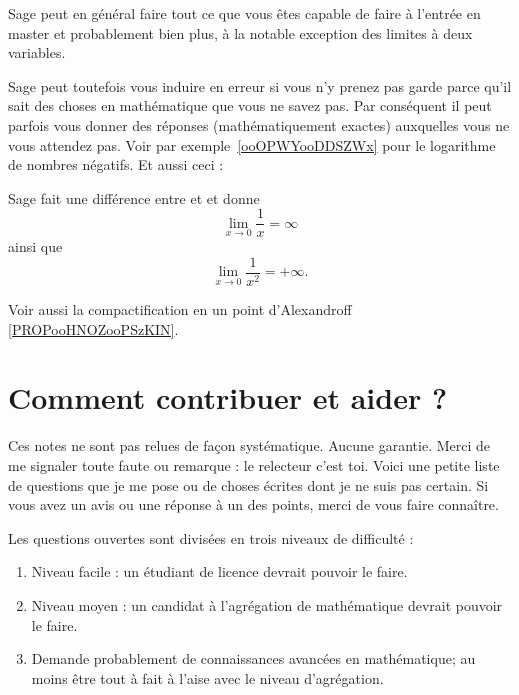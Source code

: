 Sage peut en général faire tout ce que vous êtes capable de faire à l'entrée en master et probablement bien plus, à la notable exception des limites à deux variables.

\begin{remark}
    Sage peut toutefois vous induire en erreur si vous n'y prenez pas garde parce qu'il sait des choses en mathématique que vous ne savez pas. Par conséquent il peut parfois vous donner des réponses (mathématiquement exactes) auxquelles vous ne vous attendez pas. Voir par exemple~\ref{ooOPWYooDDSZWx} pour le logarithme de nombres négatifs. Et aussi ceci :



Sage fait une différence entre  et  et donne
\begin{equation}
    \lim_{x\to 0} \frac{1}{ x }=\infty
\end{equation}
ainsi que
\begin{equation}
    \lim_{x\to 0} \frac{1}{ x^2 }=+\infty.
\end{equation}
\end{remark}

Voir aussi la compactification en un point d'Alexandroff \ref{PROPooHNOZooPSzKIN}.

\section{Comment contribuer et aider ?}
\label{SecooCKWWooBFgnea}

Ces notes ne sont pas relues de façon systématique. Aucune garantie. Merci de me signaler toute faute ou remarque : le relecteur c'est toi. Voici une petite liste de questions que je me pose ou de choses écrites dont je ne suis pas certain. Si vous avez un avis ou une réponse à un des points, merci de vous faire connaître.

Les questions ouvertes sont divisées en trois niveaux de difficulté :
\begin{enumerate}
    \item
        Niveau facile : un étudiant de licence devrait pouvoir le faire.
    \item
        Niveau moyen : un candidat à l'agrégation de mathématique devrait pouvoir le faire.
    \item
        Demande probablement de connaissances avancées en mathématique; au moins être tout à fait à l'aise avec le niveau d'agrégation.
\end{enumerate}

